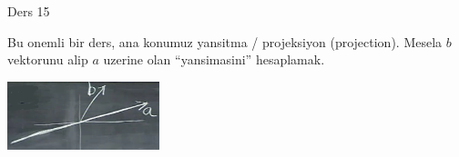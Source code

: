 \documentclass[12pt,fleqn]{article}\usepackage{../common}
\begin{document}
Ders 15

Bu onemli bir ders, ana konumuz yansitma / projeksiyon (projection). Mesela
$b$ vektorunu alip $a$ uzerine olan ``yansimasini'' hesaplamak. 

\includegraphics[height=2cm]{15_1.png}
\end{document}
